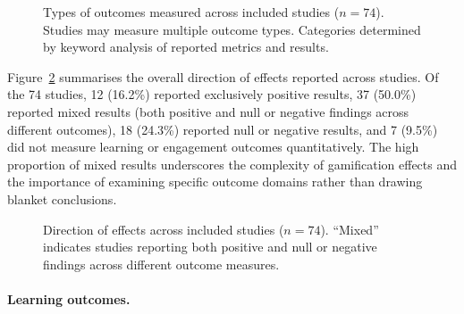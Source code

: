 \documentclass[a4paper,fleqn]{cas-sc}
\begin{document}
\begin{figure}[ht!]
\centering
{}
\caption{Types of outcomes measured across included studies ($n=74$). Studies may measure multiple outcome types. Categories determined by keyword analysis of reported metrics and results.}
\label{fig:outcome_types}
\end{figure}

Figure~\ref{fig:effect_direction} summarises the overall direction of effects reported across studies. Of the 74 studies, 12 (16.2\%) reported exclusively positive results, 37 (50.0\%) reported mixed results (both positive and null or negative findings across different outcomes), 18 (24.3\%) reported null or negative results, and 7 (9.5\%) did not measure learning or engagement outcomes quantitatively. The high proportion of mixed results underscores the complexity of gamification effects and the importance of examining specific outcome domains rather than drawing blanket conclusions.

\begin{figure}[ht!]
\centering
{}
\caption{Direction of effects across included studies ($n=74$). ``Mixed'' indicates studies reporting both positive and null or negative findings across different outcome measures.}
\label{fig:effect_direction}
\end{figure}

\paragraph{Learning outcomes.}
\end{document}
